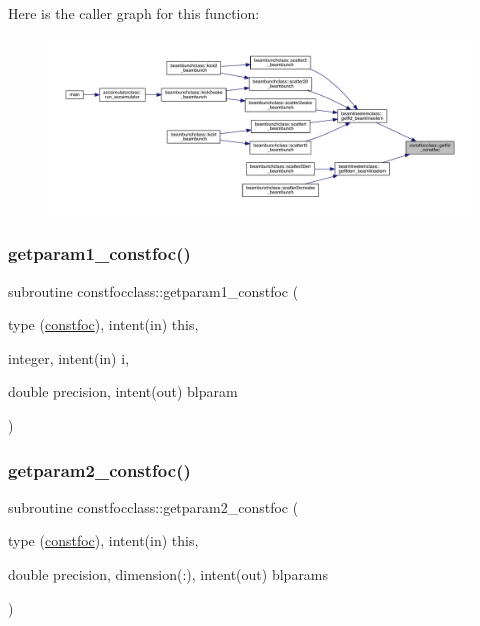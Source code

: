 Here is the caller graph for this function\+:\nopagebreak
\begin{figure}[H]
\begin{center}
\leavevmode
\includegraphics[width=350pt]{namespaceconstfocclass_a34425bf98b4a4cff016108f25a629dff_icgraph}
\end{center}
\end{figure}
\mbox{\label{namespaceconstfocclass_ab906b8830f5fb2cec09297d5004494e9}} 
\subsubsection{\texorpdfstring{getparam1\_constfoc()}{getparam1\_constfoc()}}
{\footnotesize\ttfamily subroutine constfocclass\+::getparam1\+\_\+constfoc (\begin{DoxyParamCaption}\item[{type (\mbox{\hyperlink{namespaceconstfocclass_structconstfocclass_1_1constfoc}{constfoc}}), intent(in)}]{this,  }\item[{integer, intent(in)}]{i,  }\item[{double precision, intent(out)}]{blparam }\end{DoxyParamCaption})}

\mbox{\label{namespaceconstfocclass_a59ea6cb7198ad0bf8446abe6978a9069}} 
\subsubsection{\texorpdfstring{getparam2\_constfoc()}{getparam2\_constfoc()}}
{\footnotesize\ttfamily subroutine constfocclass\+::getparam2\+\_\+constfoc (\begin{DoxyParamCaption}\item[{type (\mbox{\hyperlink{namespaceconstfocclass_structconstfocclass_1_1constfoc}{constfoc}}), intent(in)}]{this,  }\item[{double precision, dimension(\+:), intent(out)}]{blparams }\end{DoxyParamCaption})}


